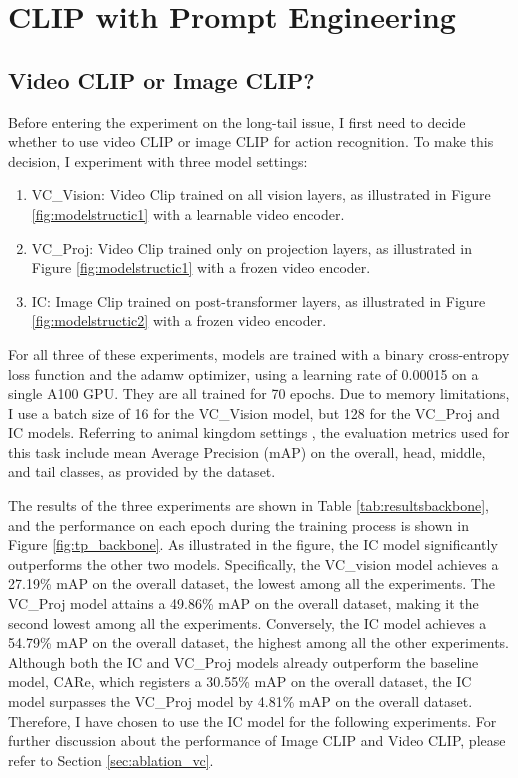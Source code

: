 \section{CLIP with Prompt Engineering}


\subsection{Video CLIP or Image CLIP?}
Before entering the experiment on the long-tail issue, I first need to decide whether to use video CLIP or image CLIP for action recognition. To make this decision, I experiment with three model settings: 

\begin{enumerate}
    \item VC\_Vision: Video Clip trained on all vision layers, as illustrated in Figure \ref{fig:modelstructic1} with a learnable video encoder.
    \item VC\_Proj: Video Clip trained only on projection layers, as illustrated in Figure \ref{fig:modelstructic1} with a frozen video encoder.
    \item IC: Image Clip trained on post-transformer layers, as illustrated in Figure \ref{fig:modelstructic2} with a frozen video encoder.
\end{enumerate}

For all three of these experiments, models are trained with a binary cross-entropy loss function and the adamw optimizer, using a learning rate of 0.00015 on a single A100 GPU. They are all trained for 70 epochs. Due to memory limitations, I use a batch size of 16 for the VC\_Vision model, but 128 for the VC\_Proj and IC models. Referring to animal kingdom settings \parencite{ng2022animal}, the evaluation metrics used for this task include mean Average Precision (mAP) on the overall, head, middle, and tail classes, as provided by the dataset. 


The results of the three experiments are shown in Table \ref{tab:resultsbackbone}, and the performance on each epoch during the training process is shown in Figure \ref{fig:tp_backbone}. As illustrated in the figure, the IC model significantly outperforms the other two models. Specifically, the VC\_vision model achieves a 27.19\% mAP on the overall dataset, the lowest among all the experiments. The VC\_Proj model attains a 49.86\% mAP on the overall dataset, making it the second lowest among all the experiments. Conversely, the IC model achieves a 54.79\% mAP on the overall dataset, the highest among all the other experiments. Although both the IC and VC\_Proj models already outperform the baseline model, CARe, which registers a 30.55\% mAP on the overall dataset, the IC model surpasses the VC\_Proj model by 4.81\% mAP on the overall dataset. Therefore, I have chosen to use the IC model for the following experiments. For further discussion about the performance of Image CLIP and Video CLIP, please refer to Section \ref{sec:ablation_vc}.

